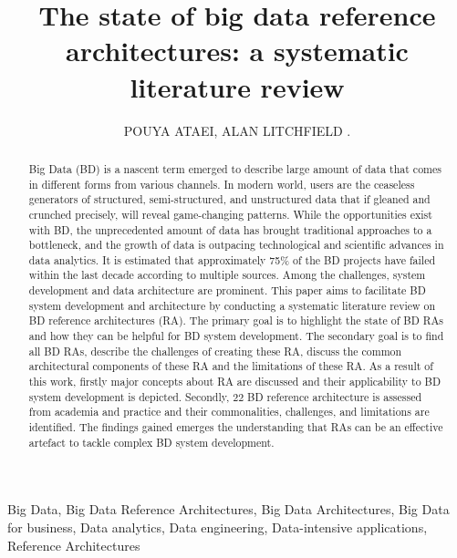 \documentclass{ieeeaccess}
\begin{document}

\title{The state of big data reference architectures: a
systematic literature review}

\author{\uppercase{Pouya Ataei},
\uppercase{Alan Litchfield} .}

\address[1]{School of Engineering, Computer and Mathematical Sciences, Auckland University of Technology, Auckland, New Zealand (e-mail: pouya.ataei@aut.ac.nz)}

\address[2]{Service and Cloud Computing Research Lab, Auckland University of Technology, Auckland, New Zealand (e-mail: alan.litchfield@aut.ac.nz)}

\begin{abstract}
    Big Data (BD) is a nascent term emerged to describe large amount of data that comes in different forms from various channels. In modern world, users are the ceaseless generators of structured, semi-structured, and unstructured data that if gleaned and crunched precisely, will reveal game-changing patterns. While the opportunities exist with BD, the unprecedented amount of data has brought traditional approaches to a bottleneck, and the growth of data is outpacing technological and scientific advances in data analytics. It is estimated that approximately 75\% of the BD projects have failed within the last decade according to multiple sources. Among the challenges, system development and data architecture are prominent. This paper aims to facilitate BD system development and architecture by conducting a systematic literature review on BD reference architectures (RA). The primary goal is to highlight the state of BD RAs and how they can be helpful for BD system development. The secondary goal is to find all BD RAs, describe the challenges of creating these RA, discuss the common architectural components of these RA and the limitations of these RA. As a result of this work, firstly major concepts about RA are discussed and their applicability to BD system development is depicted. Secondly, 22 BD reference architecture is assessed from academia and practice and their commonalities, challenges, and limitations are identified. The findings gained emerges the understanding that RAs can be an effective artefact to tackle complex BD system development.
\end{abstract}

\begin{keywords}
    Big Data, Big Data Reference Architectures, Big Data Architectures, Big Data for business, Data analytics, Data engineering, Data-intensive applications, Reference Architectures
\end{keywords}
\end{document}
